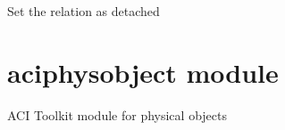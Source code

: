 \documentclass[letterpaper,10pt,english]{sphinxmanual}
\begin{document}
\begin{fulllineitems}
\begin{fulllineitems}
\end{fulllineitems}


\begin{fulllineitems}
\label{acibaseobject:acibaseobject.BaseRelation.set_as_detached}
Set the relation as detached

\end{fulllineitems}


\end{fulllineitems}



\section{aciphysobject module}
\label{aciphysobject:aciphysobject-module}\label{aciphysobject::doc}\label{aciphysobject:module-aciphysobject}
ACI Toolkit module for physical objects
\end{document}
